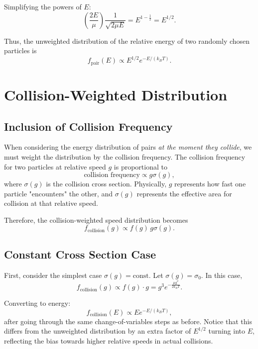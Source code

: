 Simplifying the powers of $E$:
\begin{equation}
  \left(\frac{2E}{\mu}\right) \frac{1}{\sqrt{2\mu E}} = E^{1 - \frac{1}{2}} = E^{1/2}.
\end{equation}

Thus, the unweighted distribution of the relative energy of two randomly chosen particles is
\begin{equation}
  f_{\text{pair}}(E) \propto E^{1/2} e^{-E/(k_B T)}.
\end{equation}

\section{Collision-Weighted Distribution}

\subsection{Inclusion of Collision Frequency}

When considering the energy distribution of pairs \emph{at the moment they collide}, we must weight the distribution by the collision frequency. The collision frequency for two particles at relative speed $g$ is proportional to
\begin{equation}
  \text{collision frequency} \propto g \sigma(g),
\end{equation}
where $\sigma(g)$ is the collision cross section. Physically, $g$ represents how fast one particle "encounters" the other, and $\sigma(g)$ represents the effective area for collision at that relative speed.

Therefore, the collision-weighted speed distribution becomes
\begin{equation}
  f_{\text{collision}}(g) \propto f(g) \, g \sigma(g).
\end{equation}

\subsection{Constant Cross Section Case}

First, consider the simplest case $\sigma(g) = \text{const}$. Let $\sigma(g) = \sigma_0$. In this case,
\begin{equation}
  f_{\text{collision}}(g) \propto f(g) \cdot g = g^{3} e^{-\frac{\mu g^{2}}{2 k_B T}}.
\end{equation}

Converting to energy:
\begin{equation}
  f_{\text{collision}}(E) \propto E e^{-E/(k_B T)},
\end{equation}
after going through the same change-of-variables steps as before. Notice that this differs from the unweighted distribution by an extra factor of $E^{1/2}$ turning into $E$, reflecting the bias towards higher relative speeds in actual collisions.

